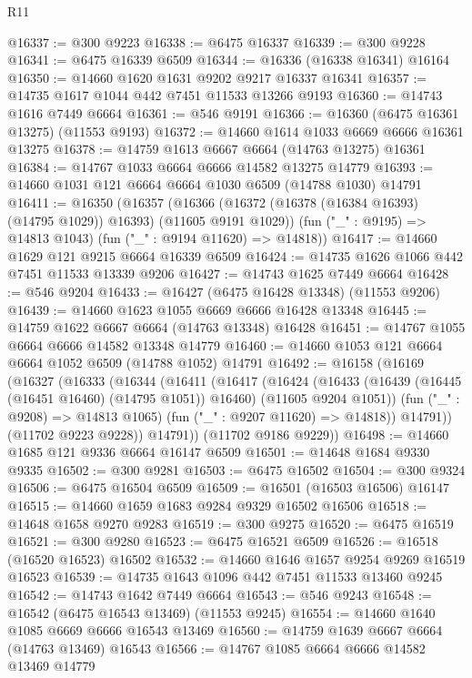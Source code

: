 \begin{lexlean}{R11}
\begin{coremodule}
{{{{{{{{{{{{{{{{{{{{{{{{{{{{{{{{{{{{{{{{{{{{{{{{{{{{{{{{{{{{{{{{{{{{{{{{{{{{{{{{{{@16337 := @300 @9223
@16338 := @6475 @16337
@16339 := @300 @9228
@16341 := @6475 @16339 @6509
@16344 := @16336 (@16338 @16341) @16164
@16350 := @14660 @1620 @1631 @9202 @9217 @16337 @16341
@16357 := @14735 @1617 @1044 @442 @7451 @11533 @13266 @9193
@16360 := @14743 @1616 @7449 @6664
@16361 := @546 @9191
@16366 := @16360 (@6475 @16361 @13275) (@11553 @9193)
@16372 := @14660 @1614 @1033 @6669 @6666 @16361 @13275
@16378 := @14759 @1613 @6667 @6664 (@14763 @13275) @16361
@16384 := @14767 @1033 @6664 @6666 @14582 @13275 @14779
@16393 := @14660 @1031 @121 @6664 @6664 @1030 @6509 (@14788 @1030) @14791
@16411 := @16350
    (@16357
      (@16366 (@16372 (@16378 (@16384 @16393) (@14795 @1029)) @16393) (@11605 @9191 @1029))
      (fun ("_" : @9195) => @14813 @1043)
      (fun ("_" : @9194 @11620) => @14818))
@16417 := @14660 @1629 @121 @9215 @6664 @16339 @6509
@16424 := @14735 @1626 @1066 @442 @7451 @11533 @13339 @9206
@16427 := @14743 @1625 @7449 @6664
@16428 := @546 @9204
@16433 := @16427 (@6475 @16428 @13348) (@11553 @9206)
@16439 := @14660 @1623 @1055 @6669 @6666 @16428 @13348
@16445 := @14759 @1622 @6667 @6664 (@14763 @13348) @16428
@16451 := @14767 @1055 @6664 @6666 @14582 @13348 @14779
@16460 := @14660 @1053 @121 @6664 @6664 @1052 @6509 (@14788 @1052) @14791
@16492 := @16158
    (@16169
      (@16327
        (@16333
          (@16344
            (@16411
              (@16417
                (@16424
                  (@16433
                    (@16439 (@16445 (@16451 @16460) (@14795 @1051)) @16460)
                    (@11605 @9204 @1051))
                  (fun ("_" : @9208) => @14813 @1065)
                  (fun ("_" : @9207 @11620) => @14818))
                @14791))
            (@11702 @9223 @9228))
          @14791))
      (@11702 @9186 @9229))
@16498 := @14660 @1685 @121 @9336 @6664 @16147 @6509
@16501 := @14648 @1684 @9330 @9335
@16502 := @300 @9281
@16503 := @6475 @16502
@16504 := @300 @9324
@16506 := @6475 @16504 @6509
@16509 := @16501 (@16503 @16506) @16147
@16515 := @14660 @1659 @1683 @9284 @9329 @16502 @16506
@16518 := @14648 @1658 @9270 @9283
@16519 := @300 @9275
@16520 := @6475 @16519
@16521 := @300 @9280
@16523 := @6475 @16521 @6509
@16526 := @16518 (@16520 @16523) @16502
@16532 := @14660 @1646 @1657 @9254 @9269 @16519 @16523
@16539 := @14735 @1643 @1096 @442 @7451 @11533 @13460 @9245
@16542 := @14743 @1642 @7449 @6664
@16543 := @546 @9243
@16548 := @16542 (@6475 @16543 @13469) (@11553 @9245)
@16554 := @14660 @1640 @1085 @6669 @6666 @16543 @13469
@16560 := @14759 @1639 @6667 @6664 (@14763 @13469) @16543
@16566 := @14767 @1085 @6664 @6666 @14582 @13469 @14779
}}}}}}}}}}}}}}}}}}}}}}}}}}}}}}}}}}}}}}}}}}}}}}}}}}}}}}}}}}}}}}}}}}}}}}}}}}}}}}}}}}
\end{coremodule}
\end{lexlean}

